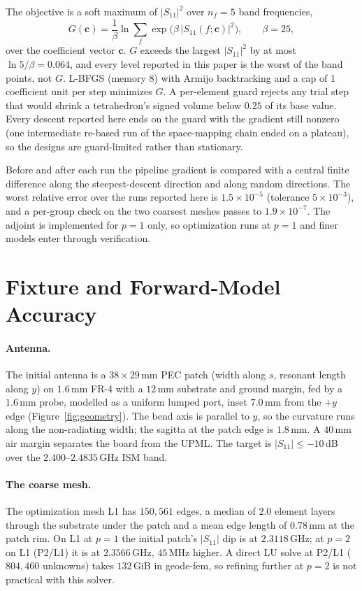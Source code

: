 \documentclass{anvil-paper}
\newcommand{\PL}{P2/L1}
\begin{document}
The objective is a soft maximum of $|S_{11}|^2$ over $n_f = 5$ band
frequencies,
\begin{equation}
  G(\mathbf{c}) = \frac{1}{\beta}\ln \sum_{f} \exp\!\big(\beta\,|S_{11}(f;\mathbf{c})|^2\big),
  \qquad \beta = 25,
  \label{eq:objective}
\end{equation}
over the coefficient vector $\mathbf{c}$. $G$ exceeds the largest
$|S_{11}|^2$ by at most $\ln 5/\beta = 0.064$, and every level reported in
this paper is the worst of the band points, not $G$. L-BFGS (memory 8) with
Armijo backtracking and a cap of 1 coefficient unit per step minimizes $G$.
A per-element guard rejects any trial step that would shrink a
tetrahedron's signed volume below $0.25$ of its base value. Every descent reported
here ends on the guard with the gradient still nonzero (one intermediate
re-based run of the space-mapping chain ended on a plateau), so the designs
are guard-limited rather than stationary.

Before and after each run the pipeline gradient is compared with a central
finite difference along the steepest-descent direction and along random
directions. The worst relative error over the runs reported here is
$1.5\times10^{-5}$ (tolerance $5\times10^{-3}$), and a per-group check on the
two coarsest meshes passes to $1.9\times10^{-7}$. The adjoint is implemented
for $p = 1$ only, so optimization runs at $p = 1$ and finer models enter
through verification.

\section{Fixture and Forward-Model Accuracy}
\label{sec:accuracy}

\paragraph{Antenna.}
The initial antenna is a $38\times29$\,mm PEC patch (width along $s$,
resonant length along $y$) on $1.6$\,mm FR-4 with a $12$\,mm substrate and
ground margin, fed by a $1.6$\,mm probe, modelled as a uniform lumped port,
inset $7.0$\,mm from the $+y$ edge (Figure~\ref{fig:geometry}). The bend axis
is parallel to $y$, so the curvature runs along the non-radiating width; the
sagitta at the patch edge is $1.8$\,mm. A $40$\,mm air margin separates the
board from the UPML. The target is $|S_{11}| \le -10$\,dB over the
$2.400$--$2.4835$\,GHz ISM band.

\paragraph{The coarse mesh.}
The optimization mesh L1 has $150{,}561$ edges, a median of $2.0$ element
layers through the substrate under the patch and a mean edge length of
$0.78$\,mm at the patch rim. On L1 at $p = 1$ the initial patch's
$|S_{11}|$ dip is at $2.3118$\,GHz; at $p = 2$ on L1 (\PL) it is at
$2.3566$\,GHz, $45$\,MHz higher. A direct LU solve at \PL{} ($804{,}460$
unknowns) takes $132$\,GiB in geode-fem, so refining further at $p = 2$ is
not practical with this solver.
\end{document}
